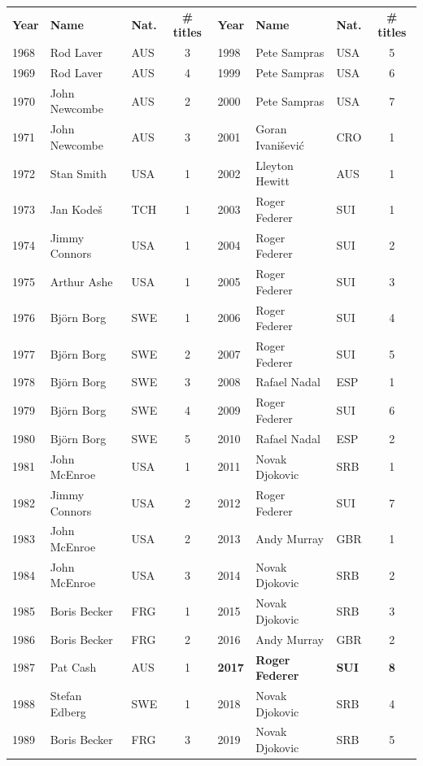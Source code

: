 \begin{tabular}{lllc@{\hspace{3.5em}}lllc}
\textbf{Year} & \textbf{Name} & \textbf{Nat.} & \textbf{\# titles} & \textbf{Year} & \textbf{Name} & \textbf{Nat.} & \textbf{\# titles} \\
1968 & Rod Laver & AUS & 3 & 1998 & Pete Sampras & USA & 5 \\
1969 & Rod Laver & AUS & 4 & 1999 & Pete Sampras & USA & 6 \\
1970 & John Newcombe & AUS & 2 & 2000 & Pete Sampras & USA & 7 \\
1971 & John Newcombe & AUS & 3 & 2001 & Goran Ivanišević & CRO & 1 \\
1972 & Stan Smith & USA & 1 & 2002 & Lleyton Hewitt & AUS & 1 \\
1973 & Jan Kodeš & TCH & 1 & 2003 & Roger Federer & SUI & 1 \\
1974 & Jimmy Connors & USA & 1 & 2004 & Roger Federer & SUI & 2 \\
1975 & Arthur Ashe & USA & 1 & 2005 & Roger Federer & SUI & 3 \\
1976 & Björn Borg & SWE & 1 & 2006 & Roger Federer & SUI & 4 \\
1977 & Björn Borg & SWE & 2 & 2007 & Roger Federer & SUI & 5 \\
1978 & Björn Borg & SWE & 3 & 2008 & Rafael Nadal & ESP & 1 \\
1979 & Björn Borg & SWE & 4 & 2009 & Roger Federer & SUI & 6 \\
1980 & Björn Borg & SWE & 5 & 2010 & Rafael Nadal & ESP & 2 \\
1981 & John McEnroe & USA & 1 & 2011 & Novak Djokovic & SRB & 1 \\
1982 & Jimmy Connors & USA & 2 & 2012 & Roger Federer & SUI & 7 \\
1983 & John McEnroe & USA & 2 & 2013 & Andy Murray & GBR & 1 \\
1984 & John McEnroe & USA & 3 & 2014 & Novak Djokovic & SRB & 2 \\
1985 & Boris Becker & FRG & 1 & 2015 & Novak Djokovic & SRB & 3 \\
1986 & Boris Becker & FRG & 2 & 2016 & Andy Murray & GBR & 2 \\
1987 & Pat Cash & AUS & 1 & \textbf{2017} & \textbf{Roger Federer} & \textbf{SUI} & \textbf{8} \\
1988 & Stefan Edberg & SWE & 1 & 2018 & Novak Djokovic & SRB & 4 \\
1989 & Boris Becker & FRG & 3 & 2019 & Novak Djokovic & SRB & 5 \\

\end{tabular}
